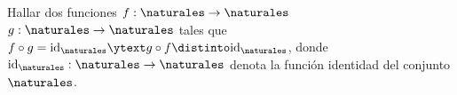 \begin{enunciado}{\ejercicio}
  Hallar dos funciones $f : \naturales \to \naturales$ \ytext $g : \naturales \to \naturales$ tales que $f \circ g = \text{id}_{\naturales}
    \ytext g \circ f \distinto \text{id}_{\naturales}$, donde $\text{id}_{\naturales}: \naturales \to \naturales$ denota la función identidad del
  conjunto $\naturales$.
\end{enunciado}
\hacer
